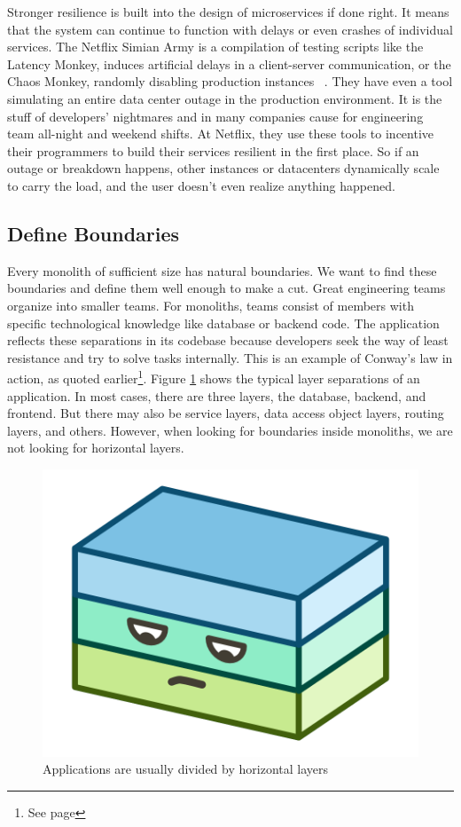 Stronger resilience is built into the design of microservices if done right. It means that the system can continue to function with delays or even crashes of individual services. The Netflix Simian Army is a compilation of testing scripts like the Latency Monkey, induces artificial delays in a client-server communication, or the Chaos Monkey, randomly disabling production instances ~\cite{netflix.2011}. They have even a tool simulating an entire data center outage in the production environment. It is the stuff of developers' nightmares and in many companies cause for engineering team all-night and weekend shifts. At Netflix, they use these tools to incentive their programmers to build their services resilient in the first place. So if an outage or breakdown happens, other instances or datacenters dynamically scale to carry the load, and the user doesn't even realize anything happened.


\subsection{Define Boundaries}

Every monolith of sufficient size has natural boundaries. We want to find these boundaries and define them well enough to make a cut. Great engineering teams organize into smaller teams. For monoliths, teams consist of members with specific technological knowledge like database or backend code. The application reflects these separations in its codebase because developers seek the way of least resistance and try to solve tasks internally. This is an example of Conway's law in action, as quoted earlier\footnote{See page \pageref{sec:theory:what:capabilities}}. Figure \ref{fig:illustration-monolith-layers} shows the typical layer separations of an application. In most cases, there are three layers, the database, backend, and frontend. But there may also be service layers, data access object layers, routing layers, and others. However, when looking for boundaries inside monoliths, we are not looking for horizontal layers.

\begin{figure}[ht]
  \centering
  \includegraphics[width=0.4\linewidth]{assets/illustration-monolith-layers.png}
  \caption{Applications are usually divided by horizontal layers}
  \label{fig:illustration-monolith-layers}
\end{figure}

